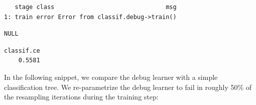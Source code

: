 \begin{Shaded}
\begin{Highlighting}[]
\SpecialCharTok{$}
\end{Highlighting}
\end{Shaded}

\begin{verbatim}
   stage class                               msg
1: train error Error from classif.debug->train()
\end{verbatim}

\begin{Shaded}
\begin{Highlighting}[]
\SpecialCharTok{$}
\end{Highlighting}
\end{Shaded}

\begin{verbatim}
NULL
\end{verbatim}

\begin{Shaded}
\begin{Highlighting}[]
\OtherTok{=}\SpecialCharTok{$}
\SpecialCharTok{$}\NormalTok{()}
\end{Highlighting}
\end{Shaded}

\begin{verbatim}
classif.ce 
    0.5581 
\end{verbatim}

In the following snippet, we compare the debug learner with a simple
classification tree. We re-parametrize the debug learner to fail in
roughly 50\% of the resampling iterations during the training step:

\begin{Shaded}
\begin{Highlighting}[]
\OtherTok{=} \NormalTok{(}\NormalTok{, } \NormalTok{)}
\SpecialCharTok{$}\OtherTok{=} \NormalTok{(}\NormalTok{)}

\OtherTok{=} \NormalTok{(}\NormalTok{(}
  \NormalTok{(}\NormalTok{)),}
  \NormalTok{(}\NormalTok{, } \NormalTok{)))}\SpecialCharTok{$}\NormalTok{(} \NormalTok{)}
\end{Highlighting}
\end{Shaded}

